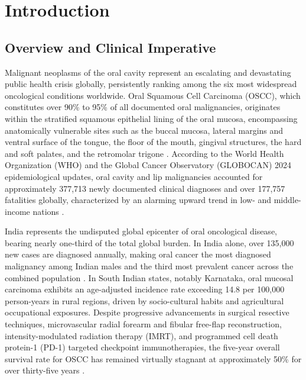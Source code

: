 \documentclass[12pt,a4paper,oneside]{report}
\begin{document}
\chapter{Introduction}
\label{ch:introduction}

\section{Overview and Clinical Imperative}
\label{sec:overview}

Malignant neoplasms of the oral cavity represent an escalating and devastating public health crisis globally, persistently ranking among the six most widespread oncological conditions worldwide. Oral Squamous Cell Carcinoma (OSCC), which constitutes over 90\% to 95\% of all documented oral malignancies, originates within the stratified squamous epithelial lining of the oral mucosa, encompassing anatomically vulnerable sites such as the buccal mucosa, lateral margins and ventral surface of the tongue, the floor of the mouth, gingival structures, the hard and soft palates, and the retromolar trigone \cite{sung2021global}. According to the World Health Organization (WHO) and the Global Cancer Observatory (GLOBOCAN) 2024 epidemiological updates, oral cavity and lip malignancies accounted for approximately 377,713 newly documented clinical diagnoses and over 177,757 fatalities globally, characterized by an alarming upward trend in low- and middle-income nations \cite{bray2024global}.

India represents the undisputed global epicenter of oral oncological disease, bearing nearly one-third of the total global burden. In India alone, over 135,000 new cases are diagnosed annually, making oral cancer the most diagnosed malignancy among Indian males and the third most prevalent cancer across the combined population \cite{gupta2004epidemiology}. In South Indian states, notably Karnataka, oral mucosal carcinoma exhibits an age-adjusted incidence rate exceeding 14.8 per 100,000 person-years in rural regions, driven by socio-cultural habits and agricultural occupational exposures. Despite progressive advancements in surgical resective techniques, microvascular radial forearm and fibular free-flap reconstruction, intensity-modulated radiation therapy (IMRT), and programmed cell death protein-1 (PD-1) targeted checkpoint immunotherapies, the five-year overall survival rate for OSCC has remained virtually stagnant at approximately 50\% for over thirty-five years \cite{johnson2020head}.
\end{document}
